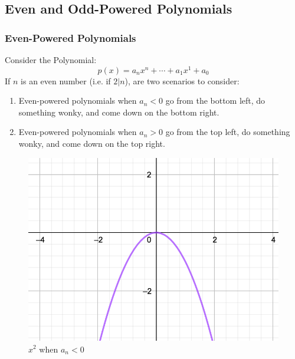 \documentclass{beamer}
\begin{document}
    \subsection{Even and Odd-Powered Polynomials}
    \begin{frame}
        \frametitle{Even-Powered Polynomials}
        Consider the Polynomial:
        $$
            p(x) = a_{n}x^n + \cdots + a_1x^1 + a_0
        $$
        If $n$ is an even number (i.e. if $2 \vert n$), are two scenarios to consider: 
        \begin{enumerate}
            \item Even-powered polynomials when $a_n < 0$ go from the bottom left, do something wonky, and come down on the bottom right.
            \item Even-powered polynomials when $a_n > 0$ go from the top left, do something wonky, and come down on the top right.
        \end{enumerate}
    \end{frame}
    \begin{frame}
        \begin{example}
            \begin{figure}
                \caption{$x^2$ when $a_n < 0$} 
                \includegraphics[scale=0.3]{images/x2-ls-0.png}
            \end{figure}
        \end{example}
    \end{frame}
\end{document}
